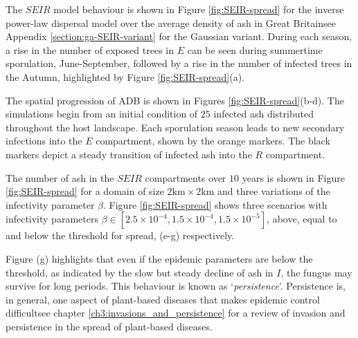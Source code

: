 The $SEIR$ model behaviour is shown in Figure \ref{fig:SEIR-spread} for the inverse power-law dispersal model over the average density of ash in Great Britain\textemdash see Appendix \ref{section:ga-SEIR-variant} for the Gaussian variant. During each season, a rise in the number of exposed trees in $E$ can be seen during summertime sporulation, June-September, followed by a rise in the number of infected trees in the Autumn, highlighted by Figure \ref{fig:SEIR-spread}(a). 

The spatial progression of ADB is shown in Figures \ref{fig:SEIR-spread}(b-d). The simulations begin from an initial condition of $25$ infected ash distributed throughout the host landscape. Each sporulation season leads to new secondary infections into the $E$ compartment, shown by the orange markers. The black markers depict a steady transition of infected ash into the $R$ compartment.

The number of ash in the $SEIR$ compartments over $10$ years is shown in Figure \ref{fig:SEIR-spread} for a domain of size $2\mathrm{km}\times2\mathrm{km}$ and three variations of the infectivity parameter $\beta$. Figure \ref{fig:SEIR-spread} shows three scenarios with infectivity parameters $\beta \in [2.5\times 10 ^{-4}, 1.5\times 10 ^{-4}, 1.5\times 10 ^{-5}]$, above, equal to and below the threshold for spread, (e-g) respectively.

Figure (g) highlights that even if the epidemic parameters are below the threshold, as indicated by the slow but steady decline of ash in $I$, the fungus may survive for long periods. This behaviour is known as `\textit{persistence}'. Persistence is, in general, one aspect of plant-based diseases that makes epidemic control difficult\textemdash see chapter \ref{ch3:invasions_and_persistence} for a review of invasion and persistence in the spread of plant-based diseases.  

